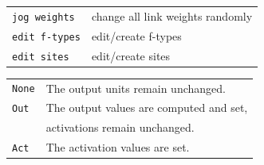 {\newpage
\clearpage
\samepage {}
}

{\newpage
\clearpage
\samepage {}
}

{\newpage
\clearpage
\samepage {}
}

{\newpage
\clearpage
\samepage {}
}

{\newpage
\clearpage
\samepage \begin{tabular}{|l|l|}
\hline
{\tt jog weights}       & change all link weights randomly\\ 
{\tt edit f-types}      & edit/create f-types\\ 
{\tt edit sites}        & edit/create sites\\ 
\hline
\end{tabular}
}

{\newpage
\clearpage
\samepage {}
}

{\newpage
\clearpage
\samepage {}
}

{\newpage
\clearpage
\samepage \begin{tabular}{|l|l|}
    \hline {\tt None} & The output units remain unchanged.\\  {\tt Out}
    & The output values are computed and set,\\  & activations remain
    unchanged.\\  {\tt Act} & The activation values are set.\\  \hline
  \end{tabular}
}

{\newpage
\clearpage
\samepage {}
}

{\newpage
\clearpage
\samepage {}
}

{\newpage
\clearpage
\samepage {}
}

{\newpage
\clearpage
\samepage {}
}

{\newpage
\clearpage
\samepage {}
}

{\newpage
\clearpage
\samepage {}
}

{\newpage
\clearpage
\samepage {}
}

{\newpage
\clearpage
\samepage {}
}

{\newpage
\clearpage
\samepage {}
}

{\newpage
\clearpage
\samepage {}
}

